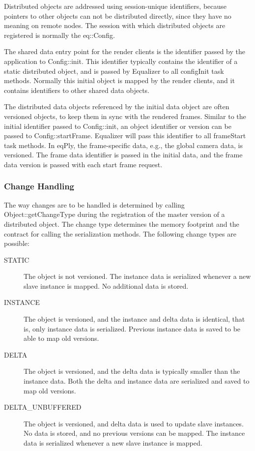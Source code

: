 \documentclass[10pt,a4]{scrartcl}
\begin{document}
Distributed objects are addressed using session-unique identifiers,
because pointers to other objects can not be distributed directly, since
they have no meaning on remote nodes. The session with which distributed
objects are registered is normally the \textsf{eq::Config}.

The shared data entry point for the render clients is the identifier
passed by the application to \textsf{Config::init}. This identifier
typically contains the identifier of a static distributed object, and is
passed by Equalizer to all \textsf{configInit} task methods. Normally
this initial object is mapped by the render clients, and it contains
identifiers to other shared data objects.

The distributed data objects referenced by the initial data object are
often versioned objects, to keep them in sync with the rendered
frames. Similar to the initial identifier passed to
\textsf{Config::init}, an object identifier or version can be passed to
\textsf{Config::startFrame}. Equalizer will pass this identifier to all
\textsf{frameStart} task methods. In \textsf{eqPly}, the frame-specific
data, e.g., the global camera data, is versioned. The frame data
identifier is passed in the initial data, and the frame data version is
passed with each start frame request.

\subsubsection{Change Handling}

The way changes are to be handled is determined by calling
\textsf{Object::getChangeType} during the registration of the master
version of a distributed object. The change type determines the memory
footprint and the contract for calling the serialization methods. The
following change types are possible:

\begin{description}
  \item[STATIC] The object is not versioned. The instance data is
    serialized whenever a new slave instance is mapped. No additional
    data is stored.
  \item[INSTANCE] The object is versioned, and the instance and delta
    data is identical, that is, only instance data is
    serialized. Previous instance data is saved to be able to map old
    versions.
  \item[DELTA] The object is versioned, and the delta data is typically
    smaller than the instance data. Both the delta and instance data are
    serialized and saved to map old versions.
  \item[DELTA\_UNBUFFERED] The object is versioned, and delta data is
    used to update slave instances. No data is stored, and no previous
    versions can be mapped. The instance data is serialized whenever a
    new slave instance is mapped.
\end{description}
\end{document}
